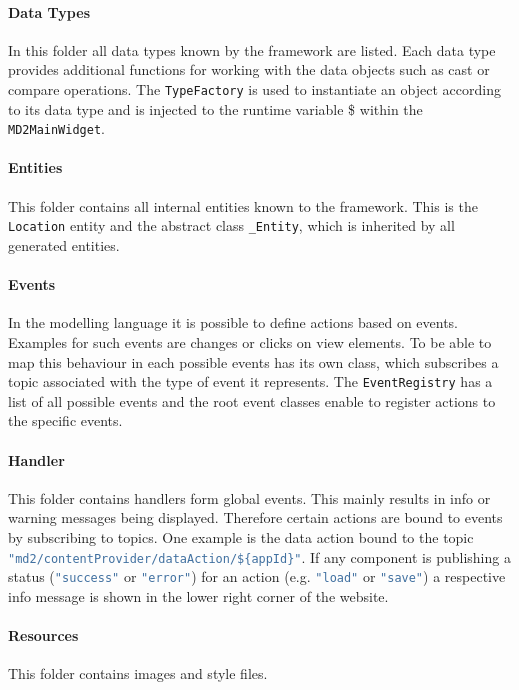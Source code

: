 \paragraph{Data Types}
In this folder all data types known by the \MD \mapapps framework are listed. Each data type provides additional functions for working with the data objects such as cast or compare operations. The \lstinline|TypeFactory| is used to instantiate an object according to its data type and is injected to the runtime variable \$ within the \lstinline|MD2MainWidget|.

\paragraph{Entities}\label{par:Entities}
This folder contains all internal entities known to the \MD \mapapps framework. This is the \lstinline|Location| entity and the abstract class \lstinline|_Entity|, which is inherited by all generated entities.

\paragraph{Events}
In the \MD modelling language it is possible to define actions based on events. Examples for such events are changes or clicks on view elements. To be able to map this behaviour in \mapapps each possible events has its own class, which subscribes a topic associated with the type of event it represents. The \lstinline|EventRegistry| has a list of all possible events and the root event classes enable to register actions to the specific events.

\paragraph{Handler}
This folder contains handlers form global events. This mainly results in info or warning messages being displayed. Therefore certain actions are bound to events by subscribing to topics. One example is the data action bound to the topic \lstinline[language=Javascript]|"md2/contentProvider/dataAction/${appId}"|. If any component is publishing a status (\lstinline[language=Javascript]|"success"| or \lstinline[language=Javascript]|"error"|) for an action (e.g. \lstinline[language=Javascript]|"load"| or \lstinline[language=Javascript]|"save"|) a respective info message is shown in the lower right corner of the website.

\paragraph{Resources}
This folder contains images and style files.

